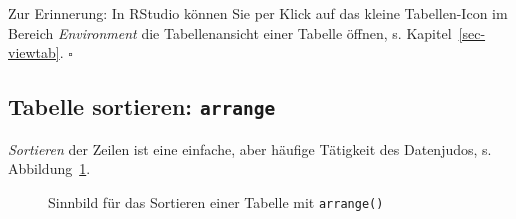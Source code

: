 \documentclass[
  a4paper,
  DIV=11]{scrreprt}
\theoremstyle{definition}
\theoremstyle{definition}
\theoremstyle{definition}
\theoremstyle{remark}
\begin{document}
\begin{tcolorbox}[enhanced jigsaw, leftrule=.75mm, opacitybacktitle=0.6, colback=white, colframe=quarto-callout-note-color-frame, coltitle=black, colbacktitle=quarto-callout-note-color!10!white, opacityback=0, left=2mm, breakable, titlerule=0mm, toptitle=1mm, bottomtitle=1mm, rightrule=.15mm, title=\textcolor{quarto-callout-note-color}{\faInfo}\hspace{0.5em}{Hinweis}, arc=.35mm, bottomrule=.15mm, toprule=.15mm]

Zur Erinnerung: In RStudio können Sie per Klick auf das kleine
Tabellen-Icon im Bereich \emph{Environment} die Tabellenansicht einer
Tabelle öffnen, s. Kapitel~\ref{sec-viewtab}. \(\square\)

\end{tcolorbox}

\subsection{\texorpdfstring{Tabelle sortieren:
\texttt{arrange}}{Tabelle sortieren: arrange}}\label{tabelle-sortieren-arrange}

\emph{Sortieren} der Zeilen ist eine einfache, aber häufige Tätigkeit
des Datenjudos, s. Abbildung~\ref{fig-arrange}.

\begin{figure}


\caption{\label{fig-arrange}Sinnbild für das Sortieren einer Tabelle mit
\texttt{arrange()}}

\end{figure}%
\end{document}

